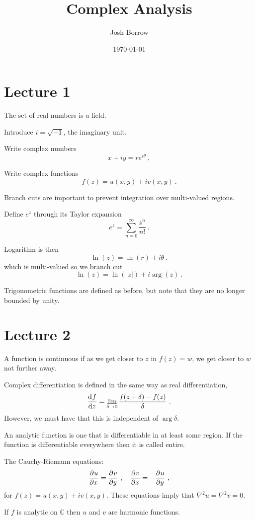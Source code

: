 \documentclass[11pt, a4paper]{article}
\begin{document}
\title{Complex Analysis}
\author{Josh Borrow}
\date{\today}

\maketitle

\section{Lecture 1}

The set of real numbers is a field.

Introduce $i = \sqrt{-1}$, the imaginary unit.

Write complex numbers
$$
	x+iy = re^{i\theta}~,
$$

Write complex functions
$$
	f(z) = u(x,y) + iv(x,y)~.
$$

Branch cuts are important to prevent integration over multi-valued regions.

Define $e^z$ through its Taylor expansion
$$
	e^z = \sum_{n=0}^\infty \frac{z^n}{n!}~.
$$

Logarithm is then
$$
	\ln(z) = \ln(r) + i\theta~.
$$
which is multi-valued so we branch cut
$$
	\ln(z) = \ln(|z|) + i \arg(z)~.
$$

Trigonometric functions are defined as before, but note that they are no longer bounded by unity.

\section{Lecture 2}

A function is continuous if as we get closer to $z$ in $f(z)=w$, we get closer to $w$ not further away.

Complex differentiation is defined in the same way as real differentiation,
$$
	\frac{\mathrm{d}^{} {f}}{\mathrm{d} {z}^{}} = \lim_{\delta \rightarrow 0}\frac{f(z + \delta) - f(z)}{\delta}~.
$$
However, we must have that this is independent of $\arg{\delta}$.

An analytic function is one that is differentiable in at least some region.
If the function is differentiable everywhere then it is called entire.

The Cauchy-Riemann equations:
$$
	\frac{\partial^{} {u}}{\partial {x}^{}} = \frac{\partial^{} {v}}{\partial {y}^{}}~, ~~~\frac{\partial^{} {v}}{\partial {x}^{}} = -\frac{\partial^{} {u}}{\partial {y}^{}}~,
$$
for $f(z) = u(x,y) + iv(x,y)$. These equations imply that $\nabla^2 u = \nabla^2 v = 0$.

If $f$ is analytic on $\mathbb{C}$ then $u$ and $v$ are harmonic functions. 
\end{document}
